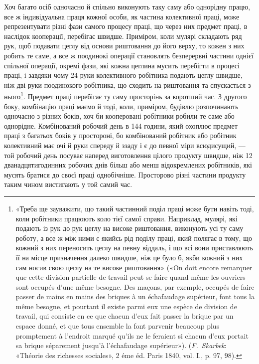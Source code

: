 Хоч багато осіб одночасно й спільно виконують таку саму або
однорідну працю, все ж індивідуальна праця кожної особи, як
частина колективної праці, може репрезентувати різні фази
самого процесу праці, що через них предмет праці, в наслідок
кооперації, перебігає швидше. Приміром, коли мулярі складають
ряд рук, щоб подавати цеглу від основи риштовання до його
верху, то кожен з них робить те саме, а все ж поодинокі операції
становлять безперервні частини однієї спільної операції, окремі
фази, які кожна цеглина мусить перебігти в процесі праці, і
завдяки чому 24 руки колективного робітника подають цеглу
швидше, ніж дві руки поодинокого робітника, що сходить на
риштовання та спускається з нього\footnote{
«Треба ще зауважити, що такий частинний поділ праці може бути
навіть тоді, коли робітники працюють коло тієї самої справи. Наприклад,
мулярі, які подають із рук до рук цеглу на високе риштовання, виконують
усі ту саму роботу, а все ж між ними є якийсь рід поділу праці, який полягає
в тому, що кожний з них переносить цеглу на певну віддаль, і що всі
вони приставляють її на місце призначення далеко швидше, ніж це було б,
якби кожний з них сам носив свою цеглу на те високе риштовання»
(«On doit encore remarquer que cette division partielle de travail peut se
faire quand même les ouvriers sont occupés d’une même besogne. Des maçons,
par exemple, occupés de faire passer de mains en mains des briques à un
échafaudage supérieur, font tous la même besogne, et pourtant il existe
parmi eux une espèce de division de travail, qui consiste en ce que chacun
d’eux fait passer la brique par un espace donné, et que tous ensemble la
font parvenir beaucoup plus promptement à l’endroit marqué qu’ils ne le
feraient si chacun d’eux portait sa brique séparement jusqu’à l’échafaudage
supérieur»). (\emph{F.~Skarbek}: «Théorie des richesses sociales», 2 éme éd.
Paris 1840, vol. I., p. 97, 98).
}. Предмет праці перебігає
ту саму просторінь за коротший час. З другого боку, комбінацію
праці маємо й тоді, коли, приміром, будівлю розпочинають одночасно
з різних боків, хоч би кооперовані робітники робили те
саме або однорідне. Комбінований робочий день в 144 години,
який охоплює предмет праці з багатьох боків у простороні, бо
комбінований робітник або робітник колективний має очі й руки
спереду й ззаду і є до певної міри всюдисущий, — той робочий
день посуває наперед виготовлення цілого продукту швидше,
ніж 12 дванадцятигодинних робочих днів більш або менш відокремлених
робітників, які мусять братися до своєї праці однобічніше.
Просторово різні частини продукту таким чином вистигають
у той самий час.

